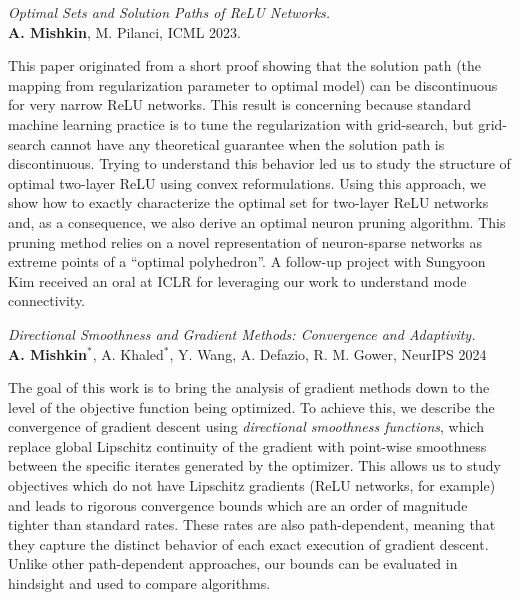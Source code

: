 \begin{description}[leftmargin=\mleftsize,style=nextline,font=\normalfont\space]


    \textit{Optimal Sets and Solution Paths of ReLU Networks.}\\
    {\bf A.  Mishkin}, M. Pilanci, ICML 2023.

    This paper originated from a short proof showing that the solution path (the
    mapping from regularization parameter to optimal model) can be
    discontinuous for very narrow ReLU networks.
    This result is concerning because standard machine learning
    practice is to tune the regularization with grid-search, but 
    grid-search cannot have any theoretical guarantee when the solution path 
    is discontinuous.
    Trying to understand this behavior led us to study the structure of optimal
    two-layer ReLU using convex reformulations. 
    Using this approach, we show how to exactly characterize the optimal set
    for two-layer ReLU networks and, as
    a consequence, we also derive an optimal neuron pruning algorithm.
    This pruning method relies on a novel representation of neuron-sparse
    networks as extreme points of a ``optimal polyhedron''. 
    A follow-up project with Sungyoon Kim received an oral at ICLR for
    leveraging our work to understand mode connectivity.

    \textit{Directional Smoothness and Gradient Methods: Convergence and
        Adaptivity.} \\
    {\bf A. Mishkin}$^*$, A. Khaled$^*$, Y. Wang, A. Defazio, R. M. Gower, NeurIPS 2024

    The goal of this work is to bring the analysis of gradient methods down
    to the level of the objective function being optimized.
    To achieve this, we describe the convergence of gradient descent using
    \emph{directional smoothness functions}, which replace global Lipschitz
    continuity of the gradient with point-wise smoothness between the specific iterates
    generated by the optimizer.
    This allows us to study objectives which do not have Lipschitz gradients
    (ReLU networks, for example) and leads to rigorous convergence bounds which
    are an order of magnitude tighter than standard rates.
    These rates are also path-dependent, meaning that they capture the distinct
    behavior of each exact execution of gradient descent.
    Unlike other path-dependent approaches, our bounds can be evaluated
    in hindsight and used to compare algorithms.


\end{description}
